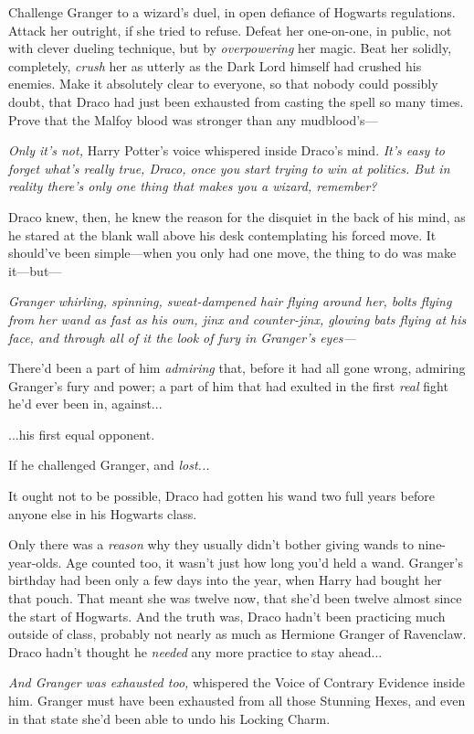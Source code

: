 Challenge Granger to a wizard’s duel, in open defiance of
Hogwarts regulations. Attack her outright, if she tried to refuse.
Defeat her one-on-one, in public, not with clever dueling
technique, but by \emph{overpowering} her magic. Beat her solidly,
completely, \emph{crush} her as utterly as the Dark Lord himself
had crushed his enemies. Make it absolutely clear to everyone, so
that nobody could possibly doubt, that Draco had just been
exhausted from casting the spell so many times. Prove that the
Malfoy blood was stronger than any mudblood’s—

\emph{Only it’s not,} Harry Potter’s voice whispered inside
Draco’s mind. \emph{It’s easy to forget what’s really true, Draco,
once you start trying to win at politics. But in reality there’s
only one thing that makes you a wizard, remember?}

Draco knew, then, he knew the reason for the disquiet in the
back of his mind, as he stared at the blank wall above his desk
contemplating his forced move. It should’ve been simple—when you
only had one move, the thing to do was make it—but—

\emph{Granger whirling, spinning, sweat-dampened hair flying around
her, bolts flying from her wand as fast as his own, jinx and
counter-jinx, glowing bats flying at his face, and through all of
it the look of fury in Granger’s eyes—}

There’d been a part of him \emph{admiring} that, before it had
all gone wrong, admiring Granger’s fury and power; a part of him
that had exulted in the first \emph{real} fight he’d ever been in,
against...

...his first equal opponent.

If he challenged Granger, and \emph{lost...}

It ought not to be possible, Draco had gotten his wand two full
years before anyone else in his Hogwarts class.

Only there was a \emph{reason} why they usually didn’t bother
giving wands to nine-year-olds. Age counted too, it wasn’t just how
long you’d held a wand. Granger’s birthday had been only a few days
into the year, when Harry had bought her that pouch. That meant she
was twelve now, that she’d been twelve almost since the start of
Hogwarts. And the truth was, Draco hadn’t been practicing much
outside of class, probably not nearly as much as Hermione Granger
of Ravenclaw. Draco hadn’t thought he \emph{needed} any more
practice to stay ahead...

\emph{And Granger was exhausted too,} whispered the Voice of
Contrary Evidence inside him. Granger must have been exhausted from
all those Stunning Hexes, and even in that state she’d been able to
undo his Locking Charm.

